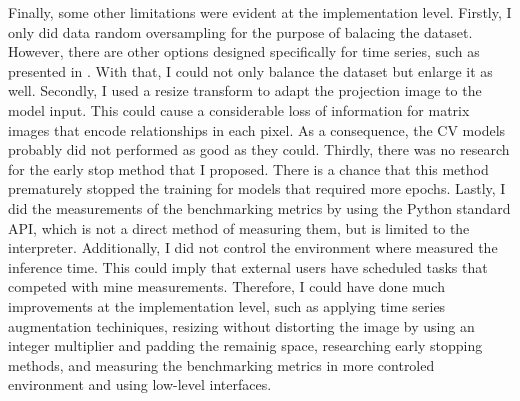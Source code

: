 Finally, some other limitations were evident at the implementation level. Firstly, I only did data random oversampling for the purpose of balacing the dataset. However, there are other options designed specifically for time series, such as presented in \cite{TimeSeriesAugmentation}. With that, I could not only balance the dataset but enlarge it as well. Secondly, I used a resize transform to adapt the projection image to the model input. This could cause a considerable loss of information for matrix images that encode relationships in each pixel. As a consequence, the \gls{CV} models probably did not performed as good as they could. Thirdly, there was no research for the early stop method that I proposed. There is a chance that this method prematurely stopped the training for models that required more epochs. Lastly, I did the measurements of the benchmarking metrics by using the Python standard API, which is not a direct method of measuring them, but is limited to the interpreter. Additionally, I did not control the environment where measured the inference time. This could imply that external users have scheduled tasks that competed with mine measurements. Therefore, I could have done much improvements at the implementation level, such as applying time series augmentation techiniques, resizing without distorting the image by using an integer multiplier and padding the remainig space, researching early stopping methods, and measuring the benchmarking metrics in more controled environment and using low-level interfaces.        

